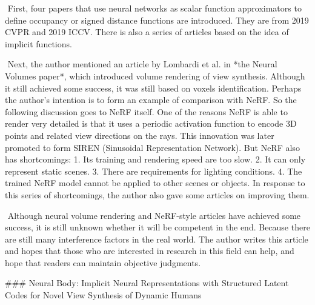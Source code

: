 ​	First, four papers that use neural networks as scalar function approximators to define occupancy or signed distance functions are introduced. They are from 2019 CVPR and 2019 ICCV. There is also a series of articles based on the idea of implicit functions.  

​	Next, the author mentioned an article by Lombardi et al. in *the Neural Volumes paper*, which introduced volume rendering of view synthesis. Although it still achieved some success, it was still based on voxels identification. Perhaps the author's intention is to form an example of comparison with NeRF. So the following discussion goes to NeRF itself. One of the reasons NeRF is able to render very detailed is that it uses a periodic activation function to encode 3D points and related view directions on the rays. This innovation was later promoted to form SIREN (Sinusoidal Representation Network). But NeRF also has shortcomings: 1. Its training and rendering speed are too slow. 2. It can only represent static scenes. 3. There are requirements for lighting conditions. 4. The trained NeRF model cannot be applied to other scenes or objects. In response to this series of shortcomings, the author also gave some articles on improving them.  

​	Although neural volume rendering and NeRF-style articles have achieved some success, it is still unknown whether it will be competent in the end. Because there are still many interference factors in the real world. The author writes this article and hopes that those who are interested in research in this field can help, and hope that readers can maintain objective judgments. 



### Neural Body: Implicit Neural Representations with Structured Latent Codes for Novel View Synthesis of Dynamic Humans

